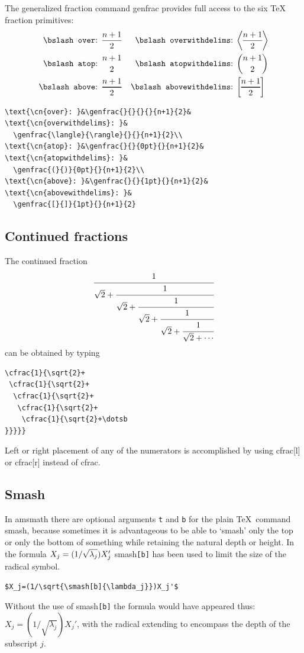 \documentclass[manuscript, printscheme]{aomart}
\newcommand{\ntt}{\normalfont\ttfamily}
\newcommand{\cn}[1]{{\protect\ntt\bslash#1}}
\newcommand{\pkg}[1]{{\protect\ntt#1}}
\newtheorem[{}\it]{thm}{Theorem}[section]
\theoremstyle{definition}
\newtheorem*[{}\it]{notation}{Notation}
\begin{document}
The generalized fraction command \cn{genfrac} provides full access to
the six \TeX{} fraction primitives:
\begin{align}
\text{\cn{over}: }&\genfrac{}{}{}{}{n+1}{2}&
\text{\cn{overwithdelims}: }&
  \genfrac{\langle}{\rangle}{}{}{n+1}{2}\\
\text{\cn{atop}: }&\genfrac{}{}{0pt}{}{n+1}{2}&
\text{\cn{atopwithdelims}: }&
  \genfrac{(}{)}{0pt}{}{n+1}{2}\\
\text{\cn{above}: }&\genfrac{}{}{1pt}{}{n+1}{2}&
\text{\cn{abovewithdelims}: }&
  \genfrac{[}{]}{1pt}{}{n+1}{2}
\end{align}
\begin{verbatim}
\text{\cn{over}: }&\genfrac{}{}{}{}{n+1}{2}&
\text{\cn{overwithdelims}: }&
  \genfrac{\langle}{\rangle}{}{}{n+1}{2}\\
\text{\cn{atop}: }&\genfrac{}{}{0pt}{}{n+1}{2}&
\text{\cn{atopwithdelims}: }&
  \genfrac{(}{)}{0pt}{}{n+1}{2}\\
\text{\cn{above}: }&\genfrac{}{}{1pt}{}{n+1}{2}&
\text{\cn{abovewithdelims}: }&
  \genfrac{[}{]}{1pt}{}{n+1}{2}
\end{verbatim}

\subsection{Continued fractions}
The continued fraction
\begin{equation}
\cfrac{1}{\sqrt{2}+
 \cfrac{1}{\sqrt{2}+
  \cfrac{1}{\sqrt{2}+
   \cfrac{1}{\sqrt{2}+
    \cfrac{1}{\sqrt{2}+\dotsb
}}}}}
\end{equation}
can be obtained by typing
\begin{verbatim}
\cfrac{1}{\sqrt{2}+
 \cfrac{1}{\sqrt{2}+
  \cfrac{1}{\sqrt{2}+
   \cfrac{1}{\sqrt{2}+
    \cfrac{1}{\sqrt{2}+\dotsb
}}}}}
\end{verbatim}
Left or right placement of any of the numerators is accomplished by using
\cn{cfrac[l]} or \cn{cfrac[r]} instead of \cn{cfrac}.

\subsection{Smash}

In \pkg{amsmath} there are optional arguments \verb"t" and \verb"b" for
the plain \TeX\ command \cn{smash}, because sometimes it is advantageous
to be able to `smash' only the top or only the bottom of something while
retaining the natural depth or height. In the formula
$X_j=(1/\sqrt{\smash[b]{\lambda_j}})X_j'$ \cn{smash}\verb=[b]= has been
used to limit the size of the radical symbol.
\begin{verbatim}
$X_j=(1/\sqrt{\smash[b]{\lambda_j}})X_j'$
\end{verbatim}
Without the use of \cn{smash}\verb=[b]= the formula would have appeared
thus: $X_j=(1/\sqrt{\lambda_j})X_j'$, with the radical extending to
encompass the depth of the subscript $j$.
\end{document}
